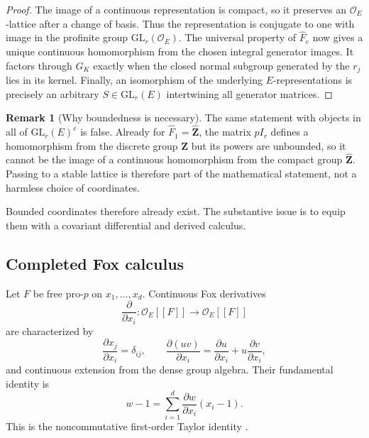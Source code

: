 \documentclass[11pt]{article}
\theoremstyle{definition}
\newtheorem{remark}[theorem]{Remark}
\begin{document}
\begin{proof}
The image of a continuous representation is compact, so it preserves an $\mathcal O_E$-lattice after a change of basis.  Thus the representation is conjugate to one with image in the profinite group $\mathrm{GL}_r(\mathcal O_E)$.  The universal property of $\widehat F_e$ now gives a unique continuous homomorphism from the chosen integral generator images.  It factors through $G_K$ exactly when the closed normal subgroup generated by the $r_j$ lies in its kernel.  Finally, an isomorphism of the underlying $E$-representations is precisely an arbitrary $S\in\mathrm{GL}_r(E)$ intertwining all generator matrices.
\end{proof}

\begin{remark}[Why boundedness is necessary]\label{rem:bounded-profinite-coordinates}
The same statement with objects in all of $\mathrm{GL}_r(E)^e$ is false.  Already for $\widehat F_1=\widehat{\mathbf Z}$, the matrix $pI_r$ defines a homomorphism from the discrete group $\mathbf Z$ but its powers are unbounded, so it cannot be the image of a continuous homomorphism from the compact group $\widehat{\mathbf Z}$.  Passing to a stable lattice is therefore part of the mathematical statement, not a harmless choice of coordinates.
\end{remark}

Bounded coordinates therefore already exist.  The substantive issue is to equip them with a covariant differential and derived calculus.

\subsection{Completed Fox calculus}

Let $F$ be free pro-$p$ on $x_1,\ldots,x_d$.  Continuous Fox derivatives
\[
\frac{\partial}{\partial x_i}:\mathcal O_E[[F]]
\longrightarrow \mathcal O_E[[F]]
\]
are characterized by
\[
\frac{\partial x_j}{\partial x_i}=\delta_{ij},
\qquad
\frac{\partial(uv)}{\partial x_i}
=\frac{\partial u}{\partial x_i}
+u\frac{\partial v}{\partial x_i},
\]
and continuous extension from the dense group algebra.  Their fundamental identity is
\begin{equation}\label{eq:fox-fundamental}
w-1
=\sum_{i=1}^{d}
\frac{\partial w}{\partial x_i}(x_i-1).
\end{equation}
This is the noncommutative first-order Taylor identity \cite{Fox}.
\end{document}
